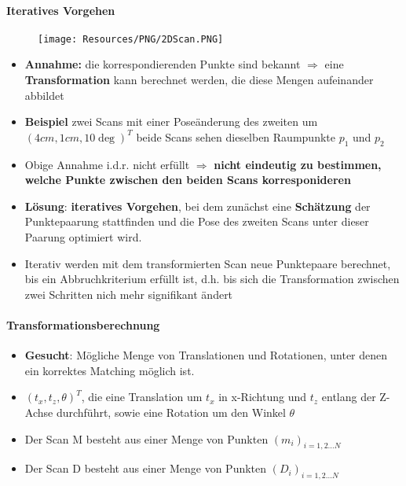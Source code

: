 \paragraph{Iteratives Vorgehen}
\begin{figure}[H]
	\begin{center}
		\texttt{[image: Resources/PNG/2DScan.PNG]}
		\caption{}
		\label{fig:PNG/2DScan.PNG}
	\end{center}
\end{figure}
\begin{itemize}
	\item \textbf{Annahme:} die korrespondierenden Punkte sind bekannt
		$\Rightarrow$ eine \textbf{Transformation} kann berechnet werden, die
		diese Mengen aufeinander abbildet
	\item \textbf{Beispiel} zwei Scans mit einer Poseänderung des zweiten um
		$(4cm, 1cm, 10 \deg)^T$ beide Scans sehen dieselben Raumpunkte $p_1$ und 
		$p_2$
	\item Obige Annahme i.d.r. nicht erfüllt $\Rightarrow$ \textbf{nicht
		eindeutig zu bestimmen, welche Punkte zwischen den beiden Scans
		korresponideren}
	\item \textbf{Lösung}: \textbf{iteratives Vorgehen}, bei dem zunächst eine
		\textbf{Schätzung} der Punktepaarung stattfinden und die Pose des zweiten
		Scans unter dieser Paarung optimiert wird.
	\item Iterativ werden mit dem transformierten Scan neue Punktepaare
		berechnet, bis ein Abbruchkriterium erfüllt ist, d.h. bis sich die
		Transformation zwischen zwei Schritten nich mehr signifikant ändert
\end{itemize}

\paragraph{Transformationsberechnung}
\begin{itemize}
	\item \textbf{Gesucht}: Mögliche Menge von Translationen und Rotationen,
		unter denen ein korrektes Matching möglich ist.
	\item $(t_x, t_z, \theta)^T$, die eine Translation um $t_x$ in x-Richtung
		und $t_z$ entlang der Z-Achse durchführt, sowie eine Rotation um den
		Winkel $\theta$
	\item Der Scan M besteht aus einer Menge von Punkten $(m_i)_{i=1,2 \dots N}$
	\item Der Scan D besteht aus einer Menge von Punkten $(D_i)_{i=1,2 \dots N}$
\end{itemize}

